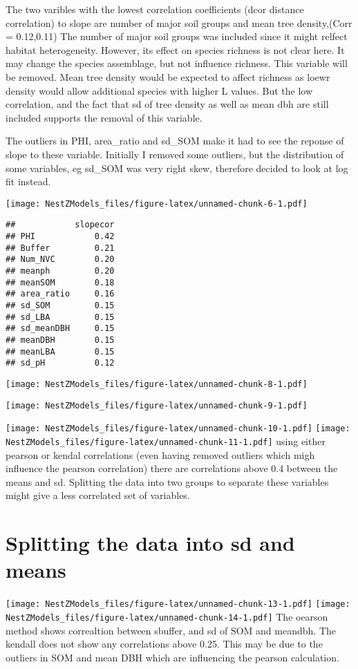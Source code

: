 \documentclass[]{article}
\begin{document}
The two varibles with the lowest correlation coefficients (dcor distance
correlation) to slope are number of major soil groups and mean tree
density,(Corr = 0.12,0.11) The number of major soil groups was included
since it might relfect habitat heterogeneity. However, its effect on
species richness is not clear here. It may change the species
assemblage, but not influence richness. This variable will be removed.
Mean tree density would be expected to affect richness as loewr density
would allow additional species with higher L values. But the low
correlation, and the fact that sd of tree density as well as mean dbh
are still included supports the removal of this variable.

The outliers in PHI, area\_ratio and sd\_SOM make it had to see the
reponse of slope to these variable. Initially I removed some outliers,
but the distribution of some variables, eg sd\_SOM was very right skew,
therefore decided to look at log fit instead.

\texttt{[image: NestZModels\_files/figure-latex/unnamed-chunk-6-1.pdf]}

\begin{verbatim}
##            slopecor
## PHI            0.42
## Buffer         0.21
## Num_NVC        0.20
## meanph         0.20
## meanSOM        0.18
## area_ratio     0.16
## sd_SOM         0.15
## sd_LBA         0.15
## sd_meanDBH     0.15
## meanDBH        0.15
## meanLBA        0.15
## sd_pH          0.12
\end{verbatim}

\texttt{[image: NestZModels\_files/figure-latex/unnamed-chunk-8-1.pdf]}

\texttt{[image: NestZModels\_files/figure-latex/unnamed-chunk-9-1.pdf]}

\texttt{[image: NestZModels\_files/figure-latex/unnamed-chunk-10-1.pdf]}
\texttt{[image: NestZModels\_files/figure-latex/unnamed-chunk-11-1.pdf]}
using either pearson or kendal correlations (even having removed
outliers which migh influence the pearson correlation) there are
correlations above 0.4 between the means and sd. Splitting the data into
two groups to separate these variables might give a less correlated set
of variables.

\section{Splitting the data into sd and
means}\label{splitting-the-data-into-sd-and-means}

\texttt{[image: NestZModels\_files/figure-latex/unnamed-chunk-13-1.pdf]}
\texttt{[image: NestZModels\_files/figure-latex/unnamed-chunk-14-1.pdf]}
The oearson method shows correaltion between sbuffer, and sd of SOM and
meandbh. The kendall does not show any correlations above 0.25. This may
be due to the outliers in SOM and mean DBH which are influencing the
pearson calculation.
\end{document}

